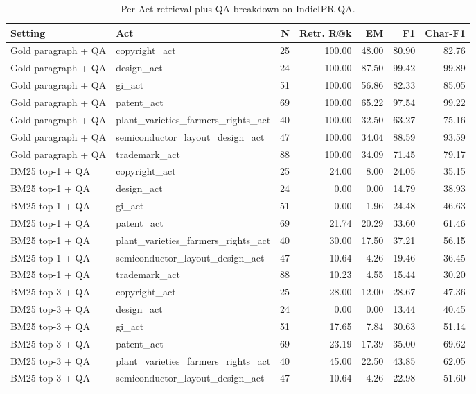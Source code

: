 \begin{table}[htbp]
\centering
\caption{Per-Act retrieval plus QA breakdown on IndicIPR-QA.}
\label{tab:retrieval_qa_per_act}
\scriptsize
\begin{tabular}{llrrrrr}
\toprule
Setting & Act & N & Retr. R@k & EM & F1 & Char-F1 \\
\midrule
Gold paragraph + QA & copyright\_act & 25 & 100.00 & 48.00 & 80.90 & 82.76 \\
Gold paragraph + QA & design\_act & 24 & 100.00 & 87.50 & 99.42 & 99.89 \\
Gold paragraph + QA & gi\_act & 51 & 100.00 & 56.86 & 82.33 & 85.05 \\
Gold paragraph + QA & patent\_act & 69 & 100.00 & 65.22 & 97.54 & 99.22 \\
Gold paragraph + QA & plant\_varieties\_farmers\_rights\_act & 40 & 100.00 & 32.50 & 63.27 & 75.16 \\
Gold paragraph + QA & semiconductor\_layout\_design\_act & 47 & 100.00 & 34.04 & 88.59 & 93.59 \\
Gold paragraph + QA & trademark\_act & 88 & 100.00 & 34.09 & 71.45 & 79.17 \\
BM25 top-1 + QA & copyright\_act & 25 & 24.00 & 8.00 & 24.05 & 35.15 \\
BM25 top-1 + QA & design\_act & 24 & 0.00 & 0.00 & 14.79 & 38.93 \\
BM25 top-1 + QA & gi\_act & 51 & 0.00 & 1.96 & 24.48 & 46.63 \\
BM25 top-1 + QA & patent\_act & 69 & 21.74 & 20.29 & 33.60 & 61.46 \\
BM25 top-1 + QA & plant\_varieties\_farmers\_rights\_act & 40 & 30.00 & 17.50 & 37.21 & 56.15 \\
BM25 top-1 + QA & semiconductor\_layout\_design\_act & 47 & 10.64 & 4.26 & 19.46 & 36.45 \\
BM25 top-1 + QA & trademark\_act & 88 & 10.23 & 4.55 & 15.44 & 30.20 \\
BM25 top-3 + QA & copyright\_act & 25 & 28.00 & 12.00 & 28.67 & 47.36 \\
BM25 top-3 + QA & design\_act & 24 & 0.00 & 0.00 & 13.44 & 40.45 \\
BM25 top-3 + QA & gi\_act & 51 & 17.65 & 7.84 & 30.63 & 51.14 \\
BM25 top-3 + QA & patent\_act & 69 & 23.19 & 17.39 & 35.00 & 69.62 \\
BM25 top-3 + QA & plant\_varieties\_farmers\_rights\_act & 40 & 45.00 & 22.50 & 43.85 & 62.05 \\
BM25 top-3 + QA & semiconductor\_layout\_design\_act & 47 & 10.64 & 4.26 & 22.98 & 51.60 \\

\end{tabular}
\end{table}
